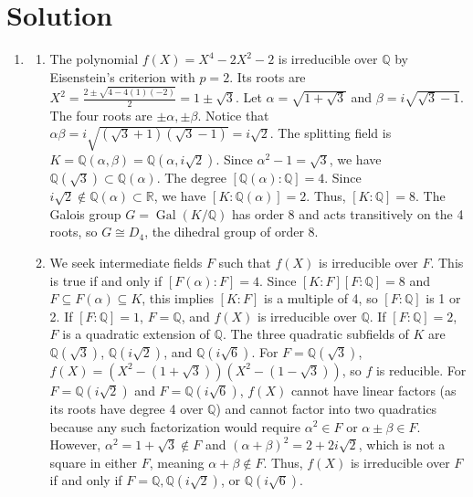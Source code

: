 \documentclass{article}
\begin{document}
\section*{Solution}
\begin{enumerate}[label=\fbox{\arabic*}]
  \item %
        \begin{enumerate}[label=(\arabic*)]
          \item The polynomial $f(X) = X^4 - 2X^2 - 2$ is irreducible over $\mathbb{Q}$ by Eisenstein's criterion with $p=2$.
                Its roots are $X^2 = \frac{2 \pm \sqrt{4 - 4(1)(-2)}}{2} = 1 \pm \sqrt{3}$.
                Let $\alpha = \sqrt{1+\sqrt{3}}$ and $\beta = i\sqrt{\sqrt{3}-1}$. The four roots are $\pm \alpha, \pm \beta$.
                Notice that $\alpha \beta = i\sqrt{(\sqrt{3}+1)(\sqrt{3}-1)} = i\sqrt{2}$.
                The splitting field is $K = \mathbb{Q}(\alpha, \beta) = \mathbb{Q}(\alpha, i\sqrt{2})$.
                Since $\alpha^2 - 1 = \sqrt{3}$, we have $\mathbb{Q}(\sqrt{3}) \subset \mathbb{Q}(\alpha)$.
                The degree $[\mathbb{Q}(\alpha):\mathbb{Q}] = 4$. Since $i\sqrt{2} \notin \mathbb{Q}(\alpha) \subset \mathbb{R}$, we have $[K:\mathbb{Q}(\alpha)] = 2$.
                Thus, $[K:\mathbb{Q}] = 8$. The Galois group $G = \operatorname{Gal}(K/\mathbb{Q})$ has order 8 and acts transitively on the 4 roots, so $G \cong D_4$, the dihedral group of order 8.
          \item We seek intermediate fields $F$ such that $f(X)$ is irreducible over $F$. This is true if and only if $[F(\alpha):F] = 4$.
                Since $[K:F][F:\mathbb{Q}] = 8$ and $F \subseteq F(\alpha) \subseteq K$, this implies $[K:F]$ is a multiple of 4, so $[F:\mathbb{Q}]$ is 1 or 2.
                If $[F:\mathbb{Q}] = 1$, $F = \mathbb{Q}$, and $f(X)$ is irreducible over $\mathbb{Q}$.
                If $[F:\mathbb{Q}] = 2$, $F$ is a quadratic extension of $\mathbb{Q}$. The three quadratic subfields of $K$ are $\mathbb{Q}(\sqrt{3})$, $\mathbb{Q}(i\sqrt{2})$, and $\mathbb{Q}(i\sqrt{6})$.
                For $F = \mathbb{Q}(\sqrt{3})$, $f(X) = (X^2 - (1+\sqrt{3}))(X^2 - (1-\sqrt{3}))$, so $f$ is reducible.
                For $F = \mathbb{Q}(i\sqrt{2})$ and $F = \mathbb{Q}(i\sqrt{6})$, $f(X)$ cannot have linear factors (as its roots have degree 4 over $\mathbb{Q}$) and cannot factor into two quadratics because any such factorization would require $\alpha^2 \in F$ or $\alpha \pm \beta \in F$. However, $\alpha^2 = 1+\sqrt{3} \notin F$ and $(\alpha+\beta)^2 = 2 + 2i\sqrt{2}$, which is not a square in either $F$, meaning $\alpha+\beta \notin F$.
                Thus, $f(X)$ is irreducible over $F$ if and only if $F = \mathbb{Q}, \mathbb{Q}(i\sqrt{2})$, or $\mathbb{Q}(i\sqrt{6})$.
        \end{enumerate}


\end{enumerate}
\end{document}
